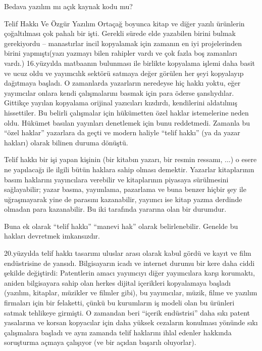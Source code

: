 \documentclass[10pt,a5paper]{book}
\begin{document}
\begin{section}{Bedava yazılım mı açık kaynak kodu mu?}
\begin{subsection}{Telif Hakkı Ve Özgür Yazılım}
Ortaçağ boyunca kitap ve   diğer yazılı ürünlerin çoğaltılması çok pahalı bir işti. Gerekli sürede elde yazabilen birini bulmak gerekiyordu -- manastırlar incil kopyalamak için zamanın en iyi projelerinden birini yapmıştı(yazı yazmayı bilen rahipler vardı ve çok fazla boş zamanları vardı.) 16.yüzyılda matbaanın bulunması ile birlikte kopyalama işlemi daha basit ve ucuz oldu ve yayımcılık sektörü satmaya değer görülen her şeyi kopyalayıp dağıtmaya başladı. O zamanlarda yazarların neredeyse hiç hakkı yoktu, eğer yayımcılar onlara kendi çalışmalarını basmak için para öderse şanslıydılar. Gittikçe yayılan kopyalama orijinal yazıcıları kızdırdı, kendilerini aldatılmış hissettiler. Bu belirli çalışmalar için hükümetten özel haklar istemelerine neden oldu. Hükümet basılan yayınları denetlemek için bunu reddetmedi. Zamanla bu “özel haklar” yazarlara da geçti ve modern haliyle “telif hakkı” (ya da yazar hakları) olarak bilinen duruma dönüştü.

Telif hakkı bir işi yapan kişinin (bir kitabın yazarı, bir resmin ressamı, ...) o esere ne yapılacağı ile ilgili bütün haklara sahip olması demektir. Yazarlar kitaplarının basım haklarını yayıncılara verebilir ve kitaplarının piyasaya sürülmesini sağlayabilir; yazar basma, yayımlama, pazarlama ve buna benzer hiçbir şey ile uğraşmayarak yine de parasını kazanabilir, yayımcı ise kitap yazma derdinde olmadan para kazanabilir. Bu iki tarafında yararına olan bir durumdur.

Buna ek olarak “telif hakkı” “manevi hak” olarak belirlenebilir. Genelde bu hakları devretmek imkansızdır.

20.yüzyılda telif hakkı tasarımı uluslar arası olarak kabul gördü ve kayıt ve film endüstrisine de yansıdı. Bilgisayarın icadı ve internet durumu bir kere daha ciddi şekilde değiştirdi: Patentlerin amacı yayımcıyı diğer yayımcılara karşı korumaktı, aniden bilgisayara sahip olan herkes dijital içerikleri kopyalamaya başladı (yazılım, kitaplar, müzikler ve filmler gibi), bu yayımcılar, müzik, filme ve yazılım firmaları için bir felaketti, çünkü bu kurumların iş modeli olan bu ürünleri satmak tehlikeye girmişti. O zamandan beri “içerik endüstrisi” daha sıkı patent yasalarına ve korsan kopyacılar için daha yüksek cezaların konulması yönünde sıkı çalışmalara başladı ve aynı zamanda telif haklarını ihlal edenler hakkında soruşturma açmaya çalışıyor (ve bir açıdan başarılı oluyorlar).


\end{subsection}
\end{section}
\end{document}

